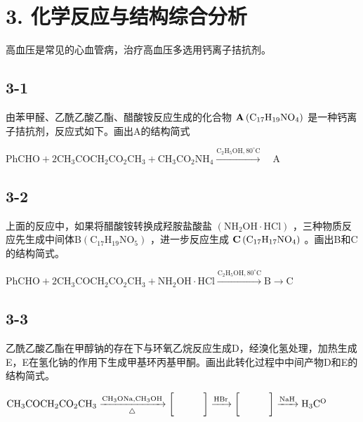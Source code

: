 \section*{3. 化学反应与结构综合分析}
⾼⾎压是常⻅的⼼⾎管病，治疗⾼⾎压多选⽤钙离⼦拮抗剂。

\subsection*{3-1}
由苯甲醛、⼄酰⼄酸⼄酯、醋酸铵反应⽣成的化合物 $\mathrm { { \bf A } \left( C _ { 1 7 } H _ { 1 9 } N O _ { 4 } \right) }$ 是⼀种钙离⼦拮抗剂，反应式如下。画出A的结构简式

$
\mathrm{PhCHO} + 2 \mathrm{CH} _ {3} \mathrm{COCH} _ {2} \mathrm{CO} _ {2} \mathrm{CH} _ {3} + \mathrm{CH} _ {3} \mathrm{CO} _ {2} \mathrm{NH} _ {4} \xrightarrow {\mathrm{C} _ {2} \mathrm{H} _ {5} \mathrm{OH} , 8 0 ^ {\circ} \mathrm{C}} \quad \mathrm{A}
$

\subsection*{3-2}
上⾯的反应中，如果将醋酸铵转换成羟胺盐酸盐 $\left( \mathrm { N H _ { 2 } O H \cdot H C l } \right)$ ，三种物质反应先⽣成中间体B$\left( \mathrm { C _ { 1 7 } H _ { 1 9 } N O _ { 5 } } \right)$ ，进⼀步反应⽣成 $\mathrm { \bf C } \left( \mathrm { C _ { 1 7 } H _ { 1 7 } N O _ { 4 } } \right)$ 。画出B和C的结构简式。

$
\mathrm{PhCHO} + 2 \mathrm{CH} _ {3} \mathrm{COCH} _ {2} \mathrm{CO} _ {2} \mathrm{CH} _ {3} + \mathrm{NH} _ {2} \mathrm{OH} \cdot \mathrm{HCl} \xrightarrow {\mathrm{C} _ {2} \mathrm{H} _ {5} \mathrm{OH} , 8 0 ^ {\circ} \mathrm{C}} \mathrm{B} \longrightarrow \mathrm{C}
$

\subsection*{3-3}
⼄酰⼄酸⼄酯在甲醇钠的存在下与环氧⼄烷反应⽣成D，经溴化氢处理，加热⽣成E，E在氢化钠的作⽤下⽣成甲基环丙基甲酮。画出此转化过程中中间产物D和E的结构简式。

$
\mathrm{CH} _ {3} \mathrm{COCH} _ {2} \mathrm{CO} _ {2} \mathrm{CH} _ {3} \xrightarrow [ \bigtriangleup ]{\mathrm{CH} _ {3} \mathrm{ONa} , \mathrm{CH} _ {3} \mathrm{OH}} \left[ \begin{array}{c c c} & & \\ & & \end{array} \right] \xrightarrow {\mathrm{HBr}} \left[ \begin{array}{c c c} & & \\ & & \end{array} \right] \xrightarrow {\mathrm{NaH}} \mathrm{H} _ {3} \mathrm{C} ^ {\mathrm{O}}
$
